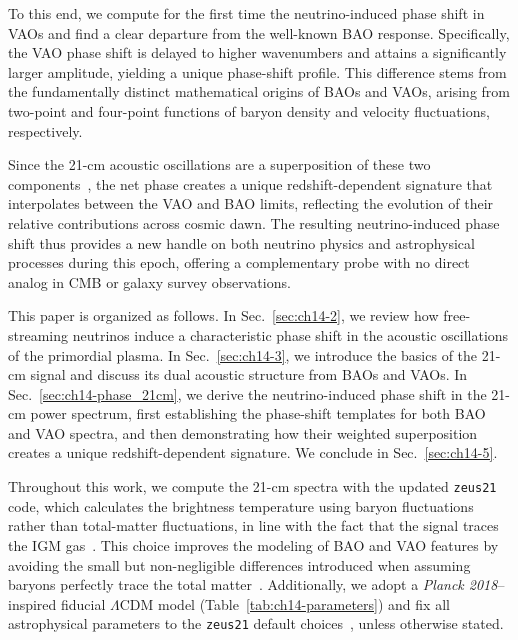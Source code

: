 To this end, we compute for the first time the neutrino-induced phase shift in VAOs and find a clear departure from the well-known BAO response. Specifically, the VAO phase shift is delayed to higher wavenumbers and attains a significantly larger amplitude, yielding a unique phase-shift profile. This difference stems from the fundamentally distinct mathematical origins of BAOs and VAOs, arising from two-point
and four-point functions of baryon density and velocity
fluctuations, respectively.


Since the 21-cm acoustic oscillations are a superposition of these two components~\citep{cruz25}, the net phase creates a unique redshift-dependent signature that interpolates between the VAO and BAO limits, reflecting the evolution of their relative contributions across cosmic dawn. The resulting neutrino-induced phase shift thus provides a new handle on both neutrino physics and astrophysical processes during this epoch, offering a complementary probe with no direct analog in CMB or galaxy survey observations.

This paper is organized as follows. In Sec.~\ref{sec:ch14-2}, we review how free-streaming neutrinos induce a characteristic phase shift in the acoustic oscillations of the primordial plasma. In Sec.~\ref{sec:ch14-3},  we introduce the basics of the 21-cm signal and discuss its dual acoustic structure  from BAOs and VAOs. In Sec.~\ref{sec:ch14-phase_21cm}, we derive the neutrino-induced phase shift in the 21-cm power spectrum, first establishing the phase-shift templates for both BAO and VAO spectra, and then demonstrating how their weighted superposition creates a unique redshift-dependent signature. We conclude in Sec.~\ref{sec:ch14-5}.

Throughout this work, we compute the 21-cm spectra with the updated \texttt{zeus21}~\cite{munoz23,munoz23b,cruz24,cruz25} code, which calculates the brightness temperature using baryon fluctuations rather than total-matter fluctuations, in line with the fact that the signal traces the IGM gas~\cite{Furlanetto:2006jb, Pritchard:2008da, Pritchard:2010pa, pritchard12,Flitter:2024eay}. This choice improves the modeling of BAO and VAO features by avoiding the small but non-negligible differences introduced when assuming baryons perfectly trace the total matter~\cite{cruz25}. Additionally, we adopt a {\it Planck 2018}--inspired fiducial $\Lambda$CDM model (Table~\ref{tab:ch14-parameters}) and fix all astrophysical parameters to the \texttt{zeus21} default choices~\cite{cruz24}, unless otherwise stated.

